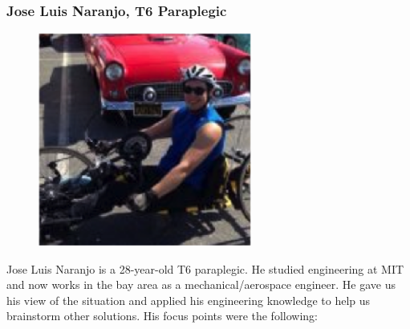 \documentclass[a4paper, 12pt,conference]{new_cit_thesis}
\begin{document}
\subsubsection{Jose Luis Naranjo, T6 Paraplegic}
\begin{figure}[h]
  \centering
     \includegraphics[width=7cm]{images/image025}
  \label{fig:25}
\end{figure}

Jose Luis Naranjo is a 28-year-old T6 paraplegic.  He studied engineering at MIT and now works in the bay area as a mechanical/aerospace engineer.  He gave us his view of the situation and applied his engineering knowledge to help us brainstorm other solutions.  His focus points were the following:
\end{document}
